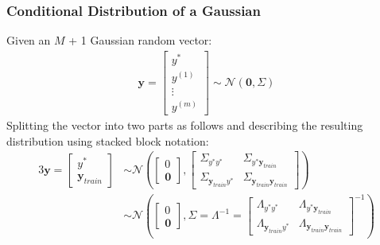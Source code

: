 \documentclass[a4paper,12pt]{article}
\begin{document}
\subsubsection{Conditional Distribution of a Gaussian}

\newcommand{\yTrain}{\bm{y}_{train}}
	\newcommand{\oneOne}{y^* y^*}
	\newcommand{\oneTwo}{y^* \yTrain}
	\newcommand{\twoOne}{\yTrain y^*}
	\newcommand{\twoTwo}{\yTrain \yTrain}
\newcommand{\sigmaMat}{\begin{bmatrix}
		\Sigma_{y^* y^*} & \Sigma_{y^* \yTrain} \\
    	\Sigma_{\yTrain y^*} & \Sigma_{\yTrain \yTrain}
	\end{bmatrix}
}
\newcommand{\lambdaMat}{\begin{bmatrix}
		\Lambda_{y^* y^*} & \Lambda_{y^* \yTrain} \\
    	\Lambda_{\yTrain y^*} & \Lambda_{\yTrain \yTrain}
	\end{bmatrix}
}
\newcommand{\Amat}{\Sigma_{\oneOne}}
\newcommand{\Bmat}{\Sigma_{\oneTwo}}
\newcommand{\Cmat}{\Sigma_{\twoOne}}
\newcommand{\Dmat}{\Sigma_{\twoTwo}}

Given an $M$ + 1 Gaussian random vector:
\begin{align}
	\bm{y} = \begin{bmatrix} 
    		y^* \\ y^{(1)} \\ \vdots \\ y^{(m)}
        \end{bmatrix}
        \sim \mathcal{N} \left( \bm{0}, \Sigma \right) 
\end{align}
Splitting the vector into two parts as follows and describing the resulting distribution 
using stacked block notation:
\begin{alignat}{3}
 	\bm{y} = \begin{bmatrix}
        	y^* \\ \yTrain
        \end{bmatrix}
        & \sim \mathcal{N} \left( \begin{bmatrix}
        		0 \\ \bm{0}
             \end{bmatrix}, \sigmaMat \right) \\
        & \sim \mathcal{N} \left( \begin{bmatrix}
        		0 \\ \bm{0}
             \end{bmatrix}, \Sigma = \Lambda^{-1} = \lambdaMat^{-1} \right)
\end{alignat}
\end{document}
